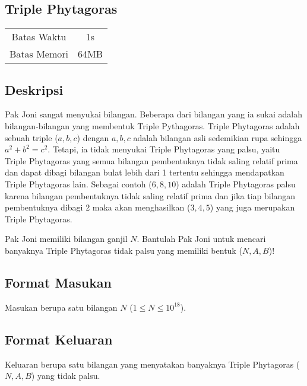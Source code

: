 \documentclass{article}
\begin{document}
\begin{center}
    \section*{Triple Phytagoras} %

    \begin{tabular}{ | c c | }
        \hline
        Batas Waktu  & 1s \\    %
        Batas Memori & 64MB \\  %
        \hline
    \end{tabular}
\end{center}

\subsection*{Deskripsi}

Pak Joni sangat menyukai bilangan. Beberapa dari bilangan yang ia sukai adalah 
bilangan-bilangan yang membentuk Triple Pythagoras. 
Triple Phytagoras adalah sebuah triple ($a, b, c$) dengan $a, b, c$ adalah bilangan asli sedemikian rupa sehingga 
$a^2 + b^2 = c^2$. Tetapi, ia tidak menyukai Triple Phytagoras yang palsu, yaitu Triple Phytagoras yang semua bilangan 
pembentuknya tidak saling relatif prima dan dapat dibagi bilangan bulat lebih dari 1 tertentu sehingga mendapatkan Triple Phytagoras lain. 
Sebagai contoh ($6, 8, 10$) adalah Triple Phytagoras palsu karena bilangan pembentuknya 
tidak saling relatif prima dan jika tiap bilangan pembentuknya dibagi 2 maka akan 
menghasilkan ($3, 4, 5$) yang juga merupakan Triple Phytagoras.

Pak Joni memiliki bilangan ganjil $N$. Bantulah Pak Joni untuk mencari banyaknya Triple Phytagoras tidak palsu yang memiliki bentuk ($N, A, B$)!


\subsection*{Format Masukan}

Masukan berupa satu bilangan $N$ ($1 \leq N \leq 10^{18}$).

\subsection*{Format Keluaran}

Keluaran berupa satu bilangan yang menyatakan banyaknya Triple Phytagoras ($N, A, B$) yang tidak palsu.
\\
\end{document}
